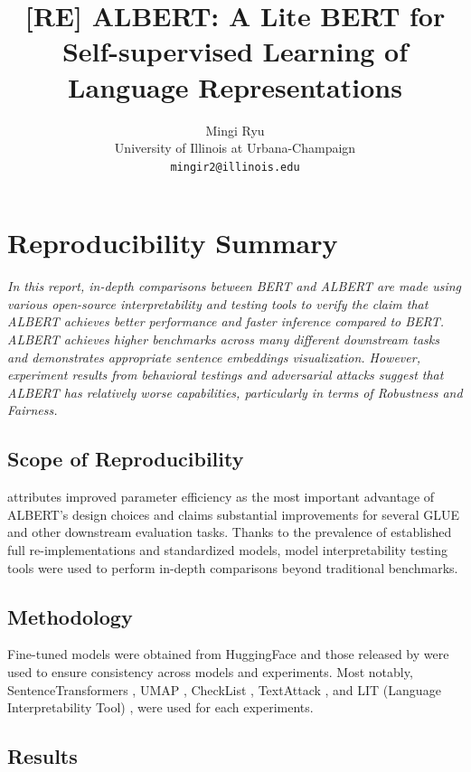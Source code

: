 \documentclass{article}
\title{[RE] ALBERT: A Lite BERT for Self-supervised Learning of Language Representations}
\author{%
  Mingi Ryu \\
  University of Illinois at Urbana-Champaign\\
  \texttt{mingir2@illinois.edu} \\
}
\begin{document}
\maketitle

\section*{\centering Reproducibility Summary}

\textit{In this report, in-depth comparisons between BERT and ALBERT are made using various open-source interpretability and testing tools to verify the claim that ALBERT achieves better performance and faster inference compared to BERT. ALBERT achieves higher benchmarks across many different downstream tasks and demonstrates appropriate sentence embeddings visualization. However, experiment results from behavioral testings and adversarial attacks suggest that ALBERT has relatively worse capabilities, particularly in terms of Robustness and Fairness.
}

\subsection*{Scope of Reproducibility}

\citet{Lan2020ALBERT} attributes improved parameter efficiency as the most important advantage of ALBERT’s design choices and claims substantial improvements for several GLUE and other downstream evaluation tasks. Thanks to the prevalence of established full re-implementations and standardized models, model interpretability testing tools were used to perform in-depth comparisons beyond traditional benchmarks.


\subsection*{Methodology}

Fine-tuned models were obtained from HuggingFace \cite{Wolf2019HuggingFacesTS} and those released by \citet{Morris2020TextAttackAF} were used to ensure consistency across models and experiments. Most notably, SentenceTransformers \cite{reimers-gurevych-2019-sentence}, UMAP \cite{McInnes2018UMAPUM}, CheckList \cite{Ribeiro2020BeyondAB}, TextAttack \cite{Morris2020TextAttackAF}, and LIT (Language Interpretability Tool) \cite{Tenney2020TheLI}, were used for each experiments.

\subsection*{Results}
\end{document}
